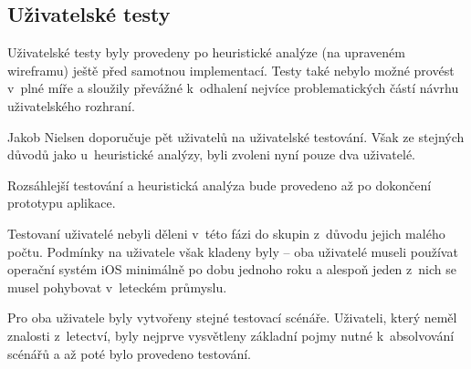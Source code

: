 \documentclass[thesis=M,czech]{FITthesis}[2012/06/26]
\begin{document}
\subsection{Uživatelské testy}
Uživatelské testy byly provedeny po heuristické analýze (na upraveném wireframu) ještě před samotnou implementací. Testy také nebylo možné provést v~plné míře a sloužily převážné k~odhalení nejvíce problematických částí návrhu uživatelského rozhraní.

Jakob Nielsen \cite{usabilityTestingNNG} doporučuje pět uživatelů na uživatelské testování. Však ze stejných důvodů jako u~heuristické analýzy, byli zvoleni nyní pouze dva uživatelé.

Rozsáhlejší testování a heuristická analýza bude provedeno až po dokončení prototypu aplikace.

Testovaní uživatelé nebyli děleni v~této fázi do skupin z~důvodu jejich malého počtu. Podmínky na uživatele však kladeny byly -- oba uživatelé museli používat operační systém iOS minimálně po dobu jednoho roku a alespoň jeden z~nich se musel pohybovat v~leteckém průmyslu.

Pro oba uživatele byly vytvořeny stejné testovací scénáře. Uživateli, který neměl znalosti z~letectví, byly nejprve vysvětleny základní pojmy nutné k~absolvování scénářů a až poté bylo provedeno testování.
\end{document}
